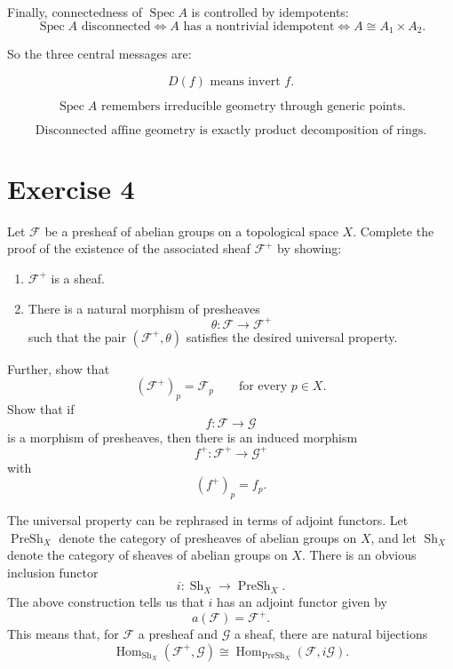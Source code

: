 \documentclass[12pt,a4paper]{article}
\newcommand{\Spec}{\operatorname{Spec}}
\begin{document}
Finally, connectedness of \(\Spec A\) is controlled by idempotents:
\[
\Spec A\text{ disconnected}
\iff
A\text{ has a nontrivial idempotent}
\iff
A\cong A_1\times A_2.
\]

So the three central messages are:

\[
\boxed{
	D(f)\text{ means invert }f.
}
\]

\[
\boxed{
	\Spec A\text{ remembers irreducible geometry through generic points.}
}
\]

\[
\boxed{
	\text{Disconnected affine geometry is exactly product decomposition of rings.}
}
\]
	
\section*{Exercise 4}

Let $\mathcal F$ be a presheaf of abelian groups on a topological space $X$.
Complete the proof of the existence of the associated sheaf $\mathcal F^+$
by showing:

\begin{enumerate}
	\item $\mathcal F^+$ is a sheaf.
	\item There is a natural morphism of presheaves
	\[
	\theta : \mathcal F \longrightarrow \mathcal F^+
	\]
	such that the pair $(\mathcal F^+,\theta)$ satisfies the desired universal property.
\end{enumerate}

Further, show that
\[
(\mathcal F^+)_p = \mathcal F_p
\qquad \text{for every } p \in X.
\]
Show that if
\[
f : \mathcal F \longrightarrow \mathcal G
\]
is a morphism of presheaves, then there is an induced morphism
\[
f^+ : \mathcal F^+ \longrightarrow \mathcal G^+
\]
with
\[
(f^+)_p = f_p.
\]

The universal property can be rephrased in terms of adjoint functors. Let
$\operatorname{PreSh}_X$ denote the category of presheaves of abelian groups on
$X$, and let $\operatorname{Sh}_X$ denote the category of sheaves of abelian
groups on $X$. There is an obvious inclusion functor
\[
i : \operatorname{Sh}_X \longrightarrow \operatorname{PreSh}_X.
\]
The above construction tells us that $i$ has an adjoint functor given by
\[
a(\mathcal F) = \mathcal F^+.
\]
This means that, for $\mathcal F$ a presheaf and $\mathcal G$ a sheaf, there
are natural bijections
\[
\operatorname{Hom}_{\operatorname{Sh}_X}(\mathcal F^+,\mathcal G)
\cong
\operatorname{Hom}_{\operatorname{PreSh}_X}(\mathcal F,i\mathcal G).
\]
\end{document}
